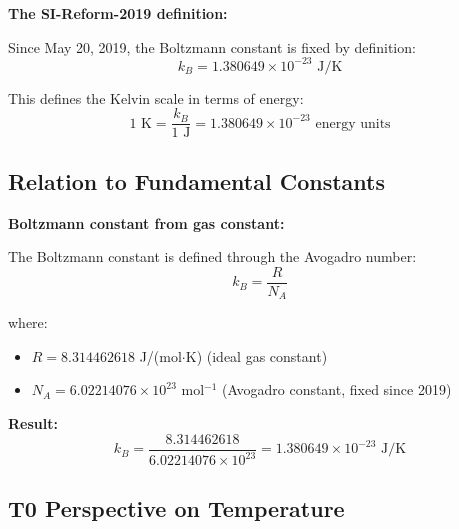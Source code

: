 \documentclass[12pt,a4paper]{article}
\begin{document}
	\begin{derivation}
		\textbf{The SI-Reform-2019 definition:}
		
		Since May 20, 2019, the Boltzmann constant is fixed by definition:
		\begin{equation}
			\boxed{k_B = 1.380649 \times 10^{-23} \text{ J/K}}
			\label{eq:kb_si}
		\end{equation}
		
		This defines the Kelvin scale in terms of energy:
		\begin{equation}
			1 \text{ K} = \frac{k_B}{1 \text{ J}} = 1.380649 \times 10^{-23} \text{ energy units}
		\end{equation}
	\end{derivation}
	
	\subsection{Relation to Fundamental Constants}
	
	\begin{keyresult}
		\textbf{Boltzmann constant from gas constant:}
		
		The Boltzmann constant is defined through the Avogadro number:
		\begin{equation}
			k_B = \frac{R}{N_A}
		\end{equation}
		
		where:
		\begin{itemize}
			\item $R = 8.314462618$ J/(mol$\cdot$K) (ideal gas constant)
			\item $N_A = 6.02214076 \times 10^{23}$ mol$^{-1}$ (Avogadro constant, fixed since 2019)
		\end{itemize}
		
		\textbf{Result:}
		\begin{equation}
			k_B = \frac{8.314462618}{6.02214076 \times 10^{23}} = 1.380649 \times 10^{-23} \text{ J/K}
		\end{equation}
	\end{keyresult}
	
	\subsection{T0 Perspective on Temperature}
	
\end{document}
